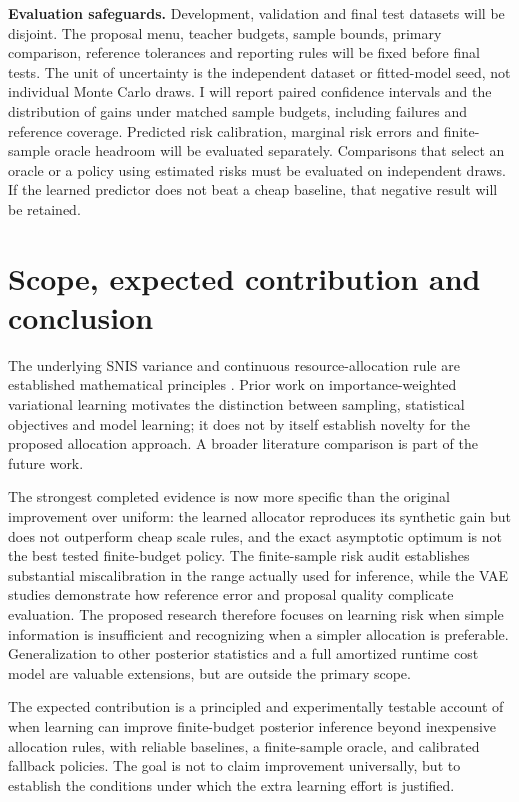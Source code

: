 \documentclass[11pt,letterpaper]{article}
\begin{document}
\textbf{Evaluation safeguards.} Development, validation and final test datasets will be disjoint. The proposal menu, teacher budgets, sample bounds, primary comparison, reference tolerances and reporting rules will be fixed before final tests. The unit of uncertainty is the independent dataset or fitted-model seed, not individual Monte Carlo draws. I will report paired confidence intervals and the distribution of gains under matched sample budgets, including failures and reference coverage. Predicted risk calibration, marginal risk errors and finite-sample oracle headroom will be evaluated separately. Comparisons that select an oracle or a policy using estimated risks must be evaluated on independent draws. If the learned predictor does not beat a cheap baseline, that negative result will be retained.
\section{Scope, expected contribution and conclusion}
The underlying SNIS variance and continuous resource-allocation rule are established mathematical principles \cite{owen2013}. Prior work on importance-weighted variational learning \cite{burda2016,rainforth2018,tucker2019} motivates the distinction between sampling, statistical objectives and model learning; it does not by itself establish novelty for the proposed allocation approach. A broader literature comparison is part of the future work.

The strongest completed evidence is now more specific than the original improvement over uniform: the learned allocator reproduces its synthetic gain but does not outperform cheap scale rules, and the exact asymptotic optimum is not the best tested finite-budget policy. The finite-sample risk audit establishes substantial miscalibration in the range actually used for inference, while the VAE studies demonstrate how reference error and proposal quality complicate evaluation. The proposed research therefore focuses on learning risk when simple information is insufficient and recognizing when a simpler allocation is preferable. Generalization to other posterior statistics and a full amortized runtime cost model are valuable extensions, but are outside the primary scope.

The expected contribution is a principled and experimentally testable account of when learning can improve finite-budget posterior inference beyond inexpensive allocation rules, with reliable baselines, a finite-sample oracle, and calibrated fallback policies. The goal is not to claim improvement universally, but to establish the conditions under which the extra learning effort is justified.
\clearpage
\end{document}
